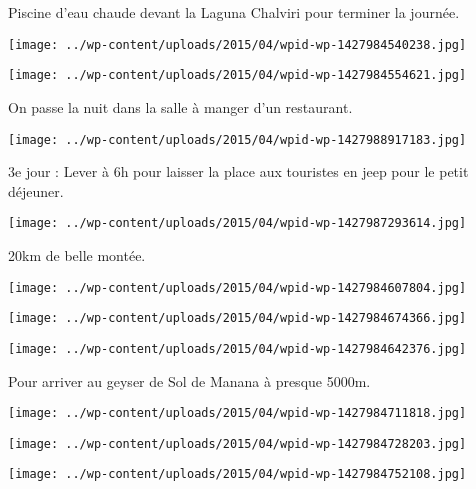  Piscine d'eau chaude devant la Laguna Chalviri pour terminer la journée. \newline
 \newline
\centerline{\texttt{[image: ../wp-content/uploads/2015/04/wpid-wp-1427984540238.jpg]} } 
 \newline
 \newline
\centerline{\texttt{[image: ../wp-content/uploads/2015/04/wpid-wp-1427984554621.jpg]} } 
 \newline
 On passe la nuit dans la salle à manger d'un restaurant. \newline
 \newline
\centerline{\texttt{[image: ../wp-content/uploads/2015/04/wpid-wp-1427988917183.jpg]} } 
 \newline
 3e jour : \newline
 Lever à 6h pour laisser la place aux touristes en jeep pour le petit déjeuner. \newline
 \newline
\centerline{\texttt{[image: ../wp-content/uploads/2015/04/wpid-wp-1427987293614.jpg]} } 
 \newline
 20km de belle montée. \newline
 \newline
\centerline{\texttt{[image: ../wp-content/uploads/2015/04/wpid-wp-1427984607804.jpg]} } 
 \newline
 \newline
\centerline{\texttt{[image: ../wp-content/uploads/2015/04/wpid-wp-1427984674366.jpg]} } 
 \newline
 \newline
\centerline{\texttt{[image: ../wp-content/uploads/2015/04/wpid-wp-1427984642376.jpg]} } 
 \newline
 Pour arriver au geyser de Sol de Manana à presque 5000m. \newline
 \newline
\centerline{\texttt{[image: ../wp-content/uploads/2015/04/wpid-wp-1427984711818.jpg]} } 
 \newline
 \newline
\centerline{\texttt{[image: ../wp-content/uploads/2015/04/wpid-wp-1427984728203.jpg]} } 
 \newline
 \newline
\centerline{\texttt{[image: ../wp-content/uploads/2015/04/wpid-wp-1427984752108.jpg]} } 
 \newline
